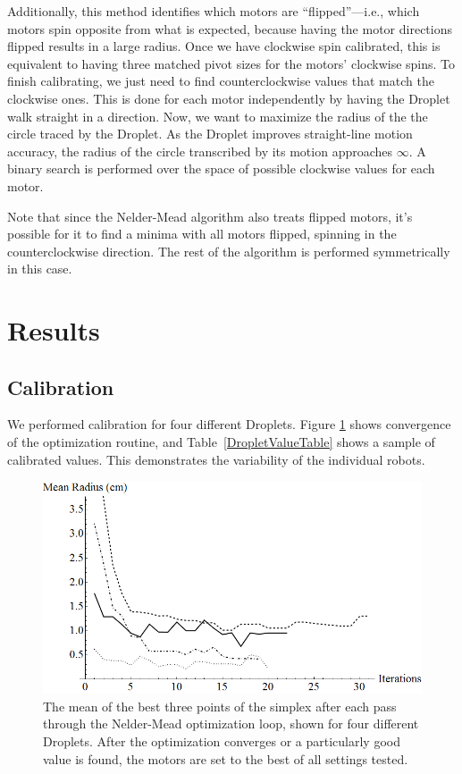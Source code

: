 \documentclass[letterpaper, 10pt, conference]{ieeeconf}
\begin{document}
Additionally, this method identifies which motors are ``flipped''---i.e., which motors spin opposite from what is expected, because having the motor directions flipped results in a large radius. Once we have clockwise spin calibrated, this is equivalent to having three matched pivot sizes for the motors' clockwise spins. To finish calibrating, we just need to find counterclockwise values that match the clockwise ones. This is done for each motor independently by having the Droplet walk straight in a direction. Now, we want to maximize the radius of the the circle traced by the Droplet. As the Droplet improves straight-line motion accuracy, the radius of the circle transcribed by its motion approaches $\infty$. A binary search is performed over the space of possible clockwise values for each motor.

Note that since the Nelder-Mead algorithm also treats flipped motors, it's possible for it to find a minima with all motors flipped, spinning in the counterclockwise direction. The rest of the algorithm is performed symmetrically in this case.

\section{Results}

\subsection{Calibration}
We performed calibration for four different Droplets. Figure \ref{fig:radiiConverging} shows convergence of the optimization routine, and Table~\ref{DropletValueTable} shows a sample of calibrated values. This demonstrates the variability of the individual robots.

\begin{figure}[!htb]
\centering
\includegraphics[width=\linewidth]{Images/radiiConverging.png}
\caption{The mean of the best three points of the simplex after each pass through the Nelder-Mead optimization loop, shown for four different Droplets. After the optimization converges or a particularly good value is found, the motors are set to the best of all settings tested.}
\label{fig:radiiConverging}
\end{figure}
\end{document}
